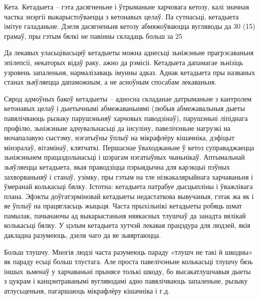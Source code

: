 Кета.
Кетадыета – гэта дасягненьне і ўтрыманьне харчовага кетозу, калі значная частка энэргіі выкарыстоўваецца з кетонавых целаў. Па сутнасьці, кетадыета імітуе галаданьне. Дзеля дасягненьня кетозу абмяжоўваюцца вугляводы да 30 (15) грамаў, пры гэтым бялкі не павінны складаць больш за 25%

Да лекавых уласьцівасьцяў кетадыеты можна аднесьці зьніжэньне прагрэсаваньня эпілепсіі, некаторых відаў раку, ажно да рэмісіі. Кетадыета дапамагае зьнізіць узровень запаленьня, нармалізаваць імунны адказ. Аднак кетадыета пры названых станах зьяўляецца дапаможным, а не асноўным спосабам лекаваньня.

Сярод адмоўных бакоў кетадыеты – адносна складанае датрыманьне з кантролем кетонавых целаў і дыетычнымі абмежаваньнямі (любыя абмежавальныя дыеты павялічваюць рызыку парушэньняў харчовых паводзінаў), парушэньні ліпіднага профілю, зьніжэньне адчувальнасьці да інсуліну, павелічэньне нагрузкі на мочапалавую сыстэму, нэгатыўны ўплыў на мікрафлёру кішачніка, дэфіцыт мінэралаў, вітамінаў, клятчаткі. Першаснае ўваходжаньне ў кетоз суправаджаецца зьніжэньнем працаздольнасьці і шэрагам нэгатыўных чыньнікаў.
Аптымальнай зьяўляецца кетадыета, якая праводзіцца пэрыядычна для карэкцыі пэўных захворваньняў і станаў, узімку, пры гэтым на тле нізкакалярыйнага харчаваньня і ўмеранай колькасьці бялку. Істотна: кетадыета патрабуе дысцыпліны і ўважлівага плана. Эфэкты доўгатэрміновай кетадыеты недастаткова вывучаныя, гэтак жа як і яе ўплыў на працягласьць жыцьця. Часта прыхільнікі кетадыеты робяць шмат памылак, пачынаючы ад выкарыстаньня няякасных тлушчаў да занадта вялікай колькасьці бялку. У цэлым кетадыета хутчэй лекавая працэдура для людзей, якія дакладна разумеюць, дзеля чаго да яе зьвяртаюцца.

Больш тлушчу.
Многія людзі часта разумеюць параду «тлушч не такі й шкодны» як параду есьці больш тлустага. Але проста павелічэньне колькасьці тлушчу бязь іншых зьменаў у харчаваньні прынясе толькі шкоду, бо высакатлушчавыя дыеты з цукрам і канцэнтраванымі вугляводамі адно павялічваюць запаленьне, рызыку атлусьценьня, пагаршаюць мікрафлёру кішачніка і г.д.
